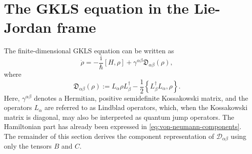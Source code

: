 \documentclass[notitlepage,aip,reprint,onecolumn]{revtex4-1}
\theoremstyle{definition}
\newcommand{\cD}{\mathcal D}
\renewcommand{\comm}[2]{\left[#1,#2\right]}
\newcommand{\acom}[2]{\left\{#1,#2\right\}}
\begin{document}
\section{The GKLS equation in the Lie-Jordan frame}\label{Sec:The GKLS equation in the LieJordan frame}
The finite-dimensional GKLS equation can be written as
\begin{equation}\label{eq:GKLS}
    \dot\rho
    =-\frac{\mathrm{i}}{\hbar}\comm{H}{\rho}
    +\gamma^{\alpha\beta}\mathfrak{D}_{\alpha\beta}(\rho),
\end{equation}
where
\begin{equation}\label{eq:D-alpha-beta}
    \mathfrak{D}_{\alpha\beta}(\rho)
    :=L_\alpha\rho L_\beta^\dagger
    -\frac12\acom{L_\beta^\dagger L_\alpha}{\rho}.
\end{equation}
Here, \(\gamma^{\alpha\beta}\) denotes a Hermitian, positive semidefinite Kossakowski matrix, and the operators \(L_\alpha\) are referred to as Lindblad operators, which, when the Kossakowski matrix is diagonal, may also be interpreted as quantum jump operators. The Hamiltonian part has already been expressed in \eqref{eq:von-neumann-components}. The remainder of this section derives the component representation of \(\cD_{\alpha\beta}\) using only the tensors \(B\) and \(C\).
\end{document}

